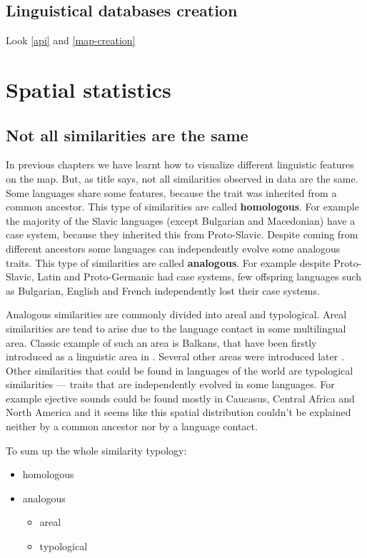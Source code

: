 \documentclass[]{book}
\providecommand{\tightlist}{%
  \setlength{\itemsep}{0pt}\setlength{\parskip}{0pt}}
\theoremstyle{definition}
\theoremstyle{definition}
\theoremstyle{definition}
\theoremstyle{remark}
\begin{document}
\section{Linguistical databases creation}\label{db-creation}

Look \ref{api} and \ref{map-creation}

\chapter{Spatial statistics}\label{statistics}

\section{Not all similarities are the
same}\label{not-all-similarities-are-the-same}

In previous chapters we have learnt how to visualize different
linguistic features on the map. But, as title says, not all similarities
observed in data are the same. Some languages share some features,
because the trait was inherited from a common ancestor. This type of
similarities are called \textbf{homologous}. For example the majority of
the Slavic languages (except Bulgarian and Macedonian) have a case
system, because they inherited this from Proto-Slavic. Despite coming
from different ancestors some languages can independently evolve some
analogous traits. This type of similarities are called
\textbf{analogous}. For example despite Proto-Slavic, Latin and
Proto-Germanic had case systems, few offspring languages such as
Bulgarian, English and French independently lost their case systems.

Analogous similarities are commonly divided into areal and typological.
Areal similarities are tend to arise due to the language contact in some
multilingual area. Classic example of such an area is Balkans, that have
been firstly introduced as a linguistic area in \citep{trubetzkoy28}.
Several other areas were introduced later \citep[see][]{muysken08}.
Other similarities that could be found in languages of the world are
typological similarities --- traits that are independently evolved in
some languages. For example ejective sounds could be found mostly in
Caucasus, Central Africa and North America and it seems like this
spatial distribution couldn't be explained neither by a common ancestor
nor by a language contact.

To sum up the whole similarity typology:

\begin{itemize}
\tightlist
\item
  homologous
\item
  analogous

  \begin{itemize}
  \tightlist
  \item
    areal
  \item
    typological
  \end{itemize}
\end{itemize}
\end{document}
